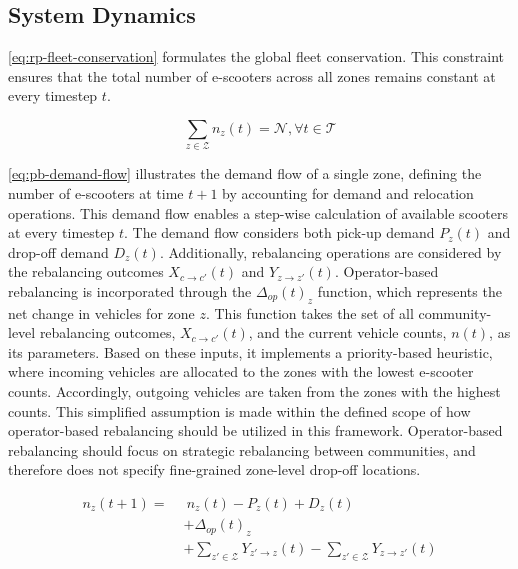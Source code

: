 \subsection{System Dynamics}\label{sec:design-problem_definition-dynamics}
 
\autoref{eq:rp-fleet-conservation} formulates the global fleet conservation.
This constraint ensures that the total number of e-scooters across all zones remains constant at every timestep $t$.

\begin{equation}\label{eq:rp-fleet-conservation}
    \sum_{z \in \mathcal{Z}}n_z(t) = \mathcal{N}, \forall t\in \mathcal{T}
\end{equation}


\autoref{eq:pb-demand-flow} illustrates the demand flow of a single zone, defining the number of e-scooters at time $t+1$ by accounting for demand and relocation operations.
This demand flow enables a step-wise calculation of available scooters at every timestep $t$.
The demand flow considers both pick-up demand $P_z(t)$ and drop-off demand $D_z(t)$.
Additionally, rebalancing operations are considered by the rebalancing outcomes $X_{c\rightarrow c'}(t)$ and $Y_{z\rightarrow z'}(t)$.
Operator-based rebalancing is incorporated through the $\Delta_{op}(t)_z$ function, which represents the net change in vehicles for zone $z$.
This function takes the set of all community-level rebalancing outcomes, $X_{c\rightarrow c'}(t)$, and the current vehicle counts, ${n}(t)$, as its parameters.
Based on these inputs, it implements a priority-based heuristic, where incoming vehicles are allocated to the zones with the lowest e-scooter counts.
Accordingly, outgoing vehicles are taken from the zones with the highest counts.
This simplified assumption is made within the defined scope of how operator-based rebalancing should be utilized in this framework.
Operator-based rebalancing should focus on strategic rebalancing between communities, and therefore does not specify fine-grained zone-level drop-off locations.

\begin{equation}\label{eq:pb-demand-flow}
    \begin{aligned}
        n_z(t+1) =\;&\ n_z(t) - P_z(t) + D_z(t) \\
        &+ \Delta_{op}(t)_z \\
        &+ \sum_{z' \in \mathcal{Z}} Y_{z'\rightarrow z}(t) - \sum_{z' \in \mathcal{Z}} Y_{z\rightarrow z'}(t)
    \end{aligned}
\end{equation}


